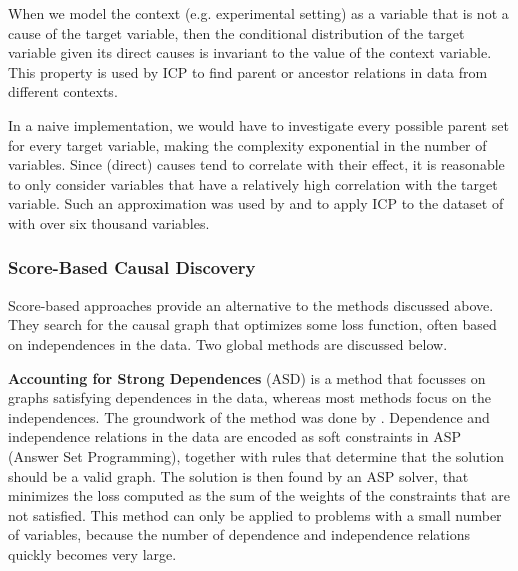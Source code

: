 When we model the context (e.g. experimental setting) as a variable that is not a cause of the target variable, then the conditional distribution of the target variable given its direct causes is invariant to the value of the context variable. This property is used by ICP to find parent or ancestor relations in data from different contexts. 

In a naive implementation, we would have to investigate every possible parent set for every target variable, making the complexity exponential in the number of variables. Since (direct) causes tend to correlate with their effect, it is reasonable to only consider variables that have a relatively high correlation with the target variable. Such an approximation was used by \citet{peters2016causal} and \citet{meinshausen2016methods} to apply ICP to the dataset of \citet{kemmeren2014large} with over six thousand variables.

    
\subsubsection{Score-Based Causal Discovery}

Score-based approaches provide an alternative to the methods discussed above. They search for the causal graph that optimizes some loss function, often based on independences in the data. Two global methods are discussed below.

\textbf{Accounting for Strong Dependences} (ASD) is a method that focusses on graphs satisfying dependences in the data, whereas most methods focus on the independences. The groundwork of the method was done by \citet{hyttinen2014constraint}. Dependence and independence relations in the data are encoded as soft constraints in ASP (Answer Set Programming), together with rules that determine that the solution should be a valid graph. The solution is then found by an ASP solver, that minimizes the loss computed as the sum of the weights of the constraints that are not satisfied. This method can only be applied to problems with a small number of variables, because the number of dependence and independence relations quickly becomes very large.

